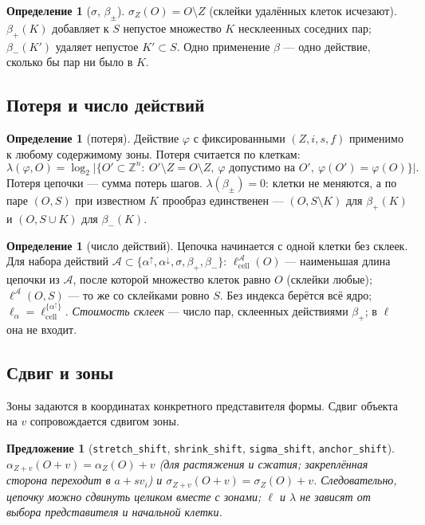 \documentclass[11pt,a4paper]{article}
\theoremstyle{plain}
\newtheorem{proposition}[theorem]{Предложение}
\theoremstyle{definition}
\newtheorem{definition}[theorem]{Определение}
\theoremstyle{remark}
\newcommand{\Z}{\mathbb{Z}}
\newcommand{\lc}{\ell_{\mathrm{cell}}}
\newcommand{\lean}[1]{\texttt{#1}}
\begin{document}
\begin{definition}[$\sigma$, $\beta_\pm$]
$\sigma_Z(O)=O\setminus Z$ (склейки удалённых клеток исчезают). $\beta_+(K)$ добавляет к $S$ непустое множество $K$ несклеенных соседних пар; $\beta_-(K')$ удаляет непустое $K'\subset S$. Одно применение $\beta$ — одно действие, сколько бы пар ни было в $K$.
\end{definition}

\subsection{Потеря и число действий}

\begin{definition}[потеря]
Действие $\varphi$ с фиксированными $(Z,i,s,f)$ применимо к любому содержимому зоны. Потеря считается по клеткам:
\[
\lambda(\varphi,O)=\log_2\bigl|\{O'\subset\Z^n:\ O'\setminus Z=O\setminus Z,\ \varphi\text{ допустимо на }O',\ \varphi(O')=\varphi(O)\}\bigr|.
\]
Потеря цепочки — сумма потерь шагов. $\lambda(\beta_\pm)=0$: клетки не меняются, а по паре $(O,S)$ при известном $K$ прообраз единственен — $(O,S\setminus K)$ для $\beta_+(K)$ и $(O,S\cup K)$ для $\beta_-(K)$.
\end{definition}

\begin{definition}[число действий]
Цепочка начинается с одной клетки без склеек. Для набора действий $\mathcal A\subset\{\alpha^\uparrow,\alpha^\downarrow,\sigma,\beta_+,\beta_-\}$:
$\lc^{\mathcal A}(O)$ — наименьшая длина цепочки из $\mathcal A$, после которой множество клеток равно $O$ (склейки любые);
$\ell^{\mathcal A}(O,S)$ — то же со склейками ровно $S$.
Без индекса берётся всё ядро; $\ell_\alpha=\lc^{\{\alpha^\uparrow\}}$. \emph{Стоимость склеек} — число пар, склеенных действиями $\beta_+$; в $\ell$ она не входит.
\end{definition}

\subsection{Сдвиг и зоны}\label{sec:shift}

Зоны задаются в координатах конкретного представителя формы. Сдвиг объекта на $v$ сопровождается сдвигом зоны.

\begin{proposition}[\lean{stretch\_shift}, \lean{shrink\_shift}, \lean{sigma\_shift}, \lean{anchor\_shift}]
$\alpha_{Z+v}(O+v)=\alpha_Z(O)+v$ (для растяжения и сжатия; закреплённая сторона переходит в $a+sv_i$) и $\sigma_{Z+v}(O+v)=\sigma_Z(O)+v$. Следовательно, цепочку можно сдвинуть целиком вместе с зонами; $\ell$ и $\lambda$ не зависят от выбора представителя и начальной клетки.
\end{proposition}
\end{document}
